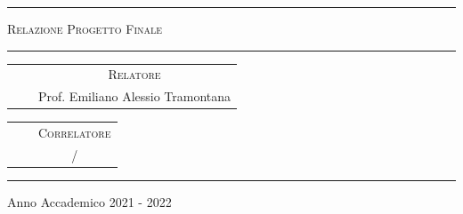 \begin{titlepage}
\bigskip

\bigskip

\bigskip

\bigskip

\bigskip

\bigskip

\begin{minipage}[b]{8 cm}
	\hrule
	
	\bigskip
	
	{\centering \scshape Relazione Progetto Finale\par}
	
	\bigskip
	
	\hrule
\end{minipage}

\bigskip

\bigskip

\bigskip

\bigskip

\bigskip

\bigskip

\begin{tabular}[t]{ccc}
	
	\textsc{} & \hspace{8cm} &\textsc{Relatore}\\
	& \hspace{8cm} & Prof. Emiliano Alessio Tramontana\\
	
\end{tabular}

\bigskip

\begin{tabular}[t]{ccc}
	
	\textsc{} & \hspace{8cm} &\textsc{Correlatore}\\
	& \hspace{8cm} & /\\
	
\end{tabular}

\bigskip

\bigskip

\bigskip

\bigskip

\bigskip

\bigskip

\bigskip

\bigskip

\bigskip

\bigskip

\bigskip

\hrule

\bigskip

{
	Anno Accademico 2021 - 2022\par
}
\end{titlepage}
